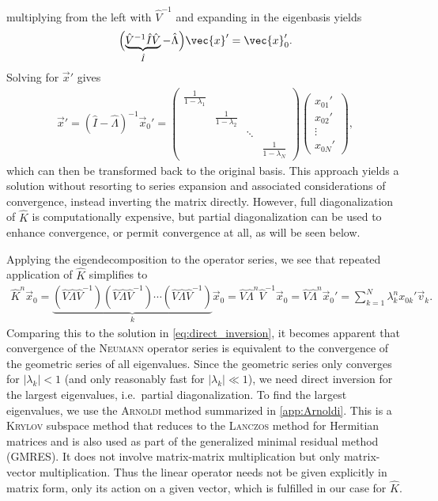 multiplying from the left with $\hat{V}^{-1}$ and expanding in the eigenbasis yields
\begin{gather}
  \Bigl ( \underbrace{\hat{V}^{-1} \hat{I} \hat{V}}_{\hat{I}} - \hat{\Lambda} \Bigr ) \vec{x}' = \vec{x}_{0}'.
\end{gather}
Solving for $\vec{x}'$ gives
\begin{gather}
  \vec{x}' = \left ( \hat{I} - \hat{\Lambda} \right )^{-1} \vec{x}_{0}' = \begin{pmatrix}
    \frac{1}{1 - \lambda_{1}} & & & \\
    & \frac{1}{1 - \lambda_{2}} & & \\
    & & \ddots & \\
    & & & \frac{1}{1 - \lambda_{N}}
  \end{pmatrix} \begin{pmatrix} x_{01}' \\ x_{02}' \\ \vdots \\ x_{0N}' \end{pmatrix}, \label{eq:direct_inversion}
\end{gather}
which can then be transformed back to the original basis. This approach yields a solution without resorting to series expansion and associated considerations of convergence, instead inverting the matrix directly. However, full diagonalization of $\hat{K}$ is computationally expensive, but partial diagonalization can be used to enhance convergence, or permit convergence at all, as will be seen below.

Applying the eigendecomposition to the operator series, we see that repeated application of $\hat{K}$ simplifies to
\begin{gather}
  \hat{K}^{n} \vec{x}_{0} = \underbrace{\left ( \hat{V} \hat{\Lambda} \hat{V}^{-1} \right ) \left ( \hat{V} \hat{\Lambda} \hat{V}^{-1} \right ) \dotsb \left ( \hat{V} \hat{\Lambda} \hat{V}^{-1} \right )}_{k} \vec{x}_{0}= \hat{V} \hat{\Lambda}^{n} \hat{V}^{-1} \vec{x}_{0} = \hat{V} \hat{\Lambda}^{n} \vec{x}_{0}' = \sum_{k = 1}^{N} \lambda_{k}^{n} x_{0 k}' \vec{v}_{k}.
\end{gather}
Comparing this to the solution in \cref{eq:direct_inversion}, it becomes apparent that convergence of the \textsc{Neumann} operator series is equivalent to the convergence of the geometric series of all eigenvalues. Since the geometric series only converges for $\lvert \lambda_{k} \rvert < 1$ (and only reasonably fast for $\lvert \lambda_{k} \rvert \ll 1$), we need direct inversion for the largest eigenvalues, i.e.\ partial diagonalization. To find the largest eigenvalues, we use the \textsc{Arnoldi} method summarized in \cref{app:Arnoldi}. This is a \textsc{Krylov} subspace method that reduces to the \textsc{Lanczos} method for Hermitian matrices and is also used as part of the generalized minimal residual method (GMRES). It does not involve matrix-matrix multiplication but only matrix-vector multiplication. Thus the linear operator needs not be given explicitly in matrix form, only its action on a given vector, which is fulfilled in our case for $\hat{K}$.

